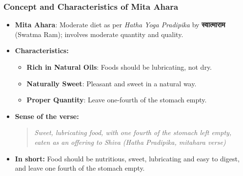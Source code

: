 

\begin{frame}[fragile]\frametitle{Concept and Characteristics of Mita Ahara}

\begin{itemize}
    \item \textbf{Mita Ahara}: Moderate diet as per \textit{Hatha Yoga Pradipika} by \textbf{स्वात्माराम} (Swatma Ram); involves moderate quantity and quality.
    \item \textbf{Characteristics:}
        \begin{itemize}
            \item \textbf{Rich in Natural Oils}: Foods should be lubricating, not dry.
            \item \textbf{Naturally Sweet}: Pleasant and sweet in a natural way.
            \item \textbf{Proper Quantity}: Leave one-fourth of the stomach empty.
        \end{itemize}
    \item \textbf{Sense of the verse:}
        \begin{quote}
            \textit{Sweet, lubricating food, with one fourth of the stomach left empty, \\
            eaten as an offering to Shiva (Hatha Pradipika, mitahara verse)}
        \end{quote}
    \item \textbf{In short:} Food should be nutritious, sweet, lubricating and easy to digest, and leave one fourth of the stomach empty.
\end{itemize}

\end{frame}



